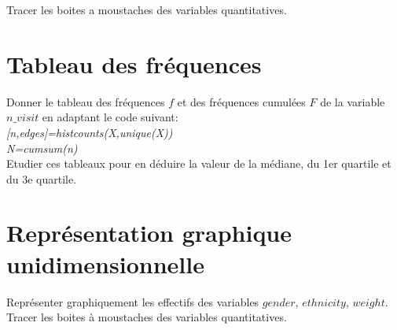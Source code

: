 \documentclass[11pt]{exam}
\begin{document}
Tracer les boites a moustaches des variables quantitatives.

\section{Tableau des fr\'equences} 
Donner le tableau des fr\'equences $f$ et des fr\'equences cumul\'ees $F$ de la variable $n\_visit$ en adaptant le code suivant:\\
\textit{[n,edges]=histcounts(X,unique(X))\\
N=cumsum(n)}
\\
Etudier ces tableaux pour en d\'eduire la valeur de la m\'ediane, du 1er quartile et du 3e quartile.
\section{Repr\'esentation graphique unidimensionnelle}
Repr\'esenter graphiquement les effectifs des variables $gender$, $ethnicity$, $weight$.\\
Tracer les boites à moustaches des variables quantitatives.
\end{document}
